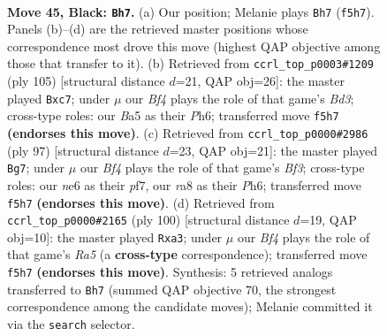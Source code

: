 \documentclass[11pt]{article}
\begin{document}
\clearpage

\begin{figure}[p]\centering
\begin{subfigure}{0.46\textwidth}\centering
\resizebox{\linewidth}{!}{%
\newchessgame
\chessboard[
  setfen={R7/8/2p1Nk2/bp3b2/8/8/8/5K2 b - - 6 45},
  showmover=false,
  pgfstyle=straightmove, color=movearrow, markmove={f5-h7}
]}
\caption{}
\end{subfigure}\hfill
\begin{subfigure}{0.46\textwidth}\centering
\resizebox{\linewidth}{!}{%
\newchessgame
\chessboard[
  setfen={8/2N4R/3b2np/2k3p1/6P1/8/5K2/8 b - - 3 53},
  showmover=false,
  pgfstyle=straightmove, color=movearrow, markmove={d6-c7}
]}
\caption{}
\end{subfigure}
\\[4pt]
\begin{subfigure}{0.46\textwidth}\centering
\resizebox{\linewidth}{!}{%
\newchessgame
\chessboard[
  setfen={8/3NkP2/5b1p/8/8/5K2/2B5/8 b - - 0 49},
  showmover=false,
  pgfstyle=straightmove, color=movearrow, markmove={f6-g7}
]}
\caption{}
\end{subfigure}\hfill
\begin{subfigure}{0.46\textwidth}\centering
\resizebox{\linewidth}{!}{%
\newchessgame
\chessboard[
  setfen={5k2/8/8/R2B4/5P2/n7/5r2/2K5 w - - 0 51},
  showmover=false,
  pgfstyle=straightmove, color=movearrow, markmove={a5-a3}
]}
\caption{}
\end{subfigure}
\caption{\textbf{Move 45, Black: \texttt{Bh7}.} (a) Our position; Melanie plays \texttt{Bh7} (\texttt{f5h7}). Panels (b)--(d) are the retrieved master positions whose correspondence most drove this move (highest QAP objective among those that transfer to it). (b) Retrieved from \texttt{ccrl\_top\_p0003\#1209} (ply 105) [structural distance $d$=21, QAP obj=26]: the master played \texttt{Bxc7}; under $\mu$ our \emph{Bf4} plays the role of that game's \emph{Bd3}; cross-type roles: our \emph{B}a5 as their \emph{P}h6; transferred move \texttt{f5h7} \textbf{(endorses this move)}. (c) Retrieved from \texttt{ccrl\_top\_p0000\#2986} (ply 97) [structural distance $d$=23, QAP obj=21]: the master played \texttt{Bg7}; under $\mu$ our \emph{Bf4} plays the role of that game's \emph{Bf3}; cross-type roles: our \emph{n}e6 as their \emph{p}f7, our \emph{r}a8 as their \emph{P}h6; transferred move \texttt{f5h7} \textbf{(endorses this move)}. (d) Retrieved from \texttt{ccrl\_top\_p0000\#2165} (ply 100) [structural distance $d$=19, QAP obj=10]: the master played \texttt{Rxa3}; under $\mu$ our \emph{Bf4} plays the role of that game's \emph{Ra5} (a \textbf{cross-type} correspondence); transferred move \texttt{f5h7} \textbf{(endorses this move)}. Synthesis: 5 retrieved analogs transferred to \texttt{Bh7} (summed QAP objective 70, the strongest correspondence among the candidate moves); Melanie committed it via the \texttt{search} selector.}
\label{fig:thought-m89}
\end{figure}
\end{document}
